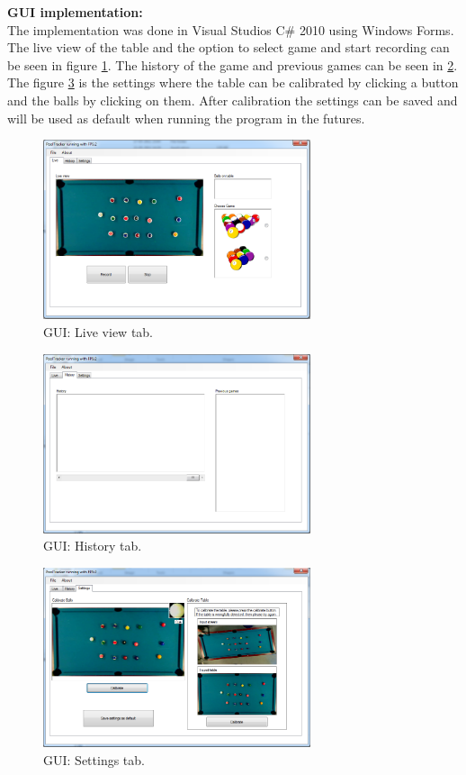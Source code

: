 \textbf{GUI implementation:}\\
The implementation was done in Visual Studios C\# 2010 using Windows Forms. The live view of the table and the option to select game and start recording can be seen in figure \ref{fig:guilive}. The history of the game and previous games can be seen in \ref{fig:guihist}. The figure \ref{fig:guisett} is the settings where the table can be calibrated by clicking a button and the balls by clicking on them. After calibration the settings can be saved and will be used as default when running the program in the futures.

\begin{figure}[H]
\begin{center}
\leavevmode
\includegraphics[width=0.7\textwidth]{images/prototype/live}
\end{center}
\caption{GUI: Live view tab.}
\label{fig:guilive}
\end{figure}

\begin{figure}[H]
\begin{center}
\leavevmode
\includegraphics[width=0.7\textwidth]{images/prototype/hist}
\end{center}
\caption{GUI: History tab.}
\label{fig:guihist}
\end{figure}

\begin{figure}[H]
\begin{center}
\leavevmode
\includegraphics[width=0.7\textwidth]{images/prototype/settings}
\end{center}
\caption{GUI: Settings tab.}
\label{fig:guisett}
\end{figure}